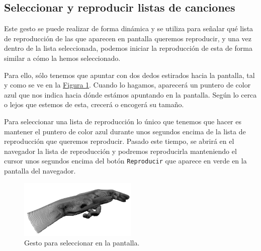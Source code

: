 \documentclass[10pt,a4paper,spanish]{article}
\begin{document}


\subsection{\textcolor{verde}Seleccionar y reproducir listas de canciones}

Este gesto se puede realizar de forma dinámica y se utiliza para señalar qué lista de reproducción de las que aparecen en pantalla queremos reproducir, y una vez dentro de la lista seleccionada, podemos iniciar la reproducción de esta de forma similar a cómo la hemos seleccionado.

Para ello, sólo tenemos que apuntar con dos dedos estirados hacia la pantalla, tal y como se ve en la \hyperref[point]{Figura \ref*{point}}. Cuando lo hagamos, aparecerá un puntero de color azul que nos indica hacia dónde estámos apuntando en la pantalla. Según lo cerca o lejos que estemos de esta, crecerá o encogerá su tamaño.

Para seleccionar una lista de reproducción lo único que tenemos que hacer es mantener el puntero de color azul durante unos segundos encima de la lista de reproducción que queremos reproducir. Pasado este tiempo, se abrirá en el navegador la lista de reproducción y podremos reproducirla manteniendo el cursor unos segundos encima del botón \texttt{Reproducir} que aparece en verde en la pantalla del navegador. 

\begin{figure}[H]
    \centering     
    \includegraphics[width=0.5\textwidth]{images/point}
    \caption{Gesto para seleccionar en la pantalla.}
    \label{point}
\end{figure}
\end{document}

